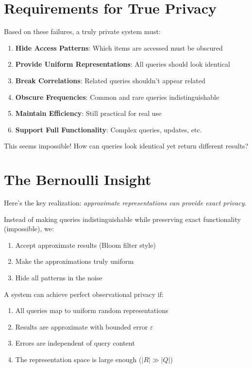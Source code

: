 \section{Requirements for True Privacy}

Based on these failures, a truly private system must:

\begin{enumerate}
\item \textbf{Hide Access Patterns}: Which items are accessed must be obscured
\item \textbf{Provide Uniform Representations}: All queries should look identical
\item \textbf{Break Correlations}: Related queries shouldn't appear related
\item \textbf{Obscure Frequencies}: Common and rare queries indistinguishable
\item \textbf{Maintain Efficiency}: Still practical for real use
\item \textbf{Support Full Functionality}: Complex queries, updates, etc.
\end{enumerate}

This seems impossible! How can queries look identical yet return different results?

\section{The Bernoulli Insight}

Here's the key realization: \textit{approximate representations can provide exact privacy}.

Instead of making queries indistinguishable while preserving exact functionality (impossible), we:
\begin{enumerate}
\item Accept approximate results (Bloom filter style)
\item Make the approximations truly uniform
\item Hide all patterns in the noise
\end{enumerate}

\begin{proposition}
A system can achieve perfect observational privacy if:
\begin{enumerate}
\item All queries map to uniform random representations
\item Results are approximate with bounded error $\varepsilon$
\item Errors are independent of query content
\item The representation space is large enough ($|R| \gg |Q|$)
\end{enumerate}
\end{proposition}

